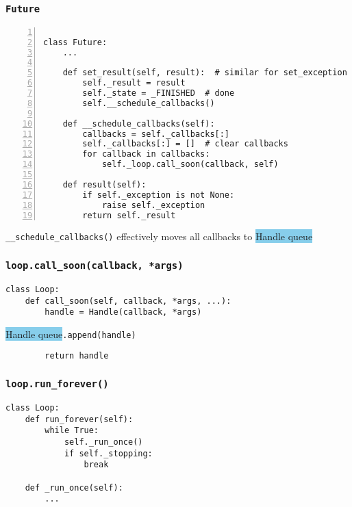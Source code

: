 \documentclass[compress,usenames,dvipsnames]{beamer}
\begin{document}
\begin{frame}
    \frametitle{\lstinline{Future}}
    \scriptsize
    \begin{lstlisting}[numbers=left]

class Future:
    ...

    def set_result(self, result):  # similar for set_exception
        self._result = result
        self._state = _FINISHED  # done
        self.__schedule_callbacks()

    def __schedule_callbacks(self):
        callbacks = self._callbacks[:]
        self._callbacks[:] = []  # clear callbacks
        for callback in callbacks:
            self._loop.call_soon(callback, self)

    def result(self):
        if self._exception is not None:
            raise self._exception
        return self._result
    \end{lstlisting}
\lstinline{__schedule_callbacks()} effectively moves all callbacks to \colorbox{SkyBlue}{Handle queue}
\end{frame}

\begin{frame}
    \frametitle{\lstinline{loop.call_soon(callback, *args)}}
    \begin{lstlisting}
class Loop:
    def call_soon(self, callback, *args, ...):
        handle = Handle(callback, *args)
    \end{lstlisting}
 \colorbox{SkyBlue}{Handle queue}\lstinline{.append(handle)}
    \begin{lstlisting}
        return handle
    \end{lstlisting}
\end{frame}

\begin{frame}
    \frametitle{\lstinline{loop.run_forever()}}
    \begin{lstlisting}
class Loop:
    def run_forever(self):
        while True:
            self._run_once()
            if self._stopping:
                break

    def _run_once(self):
        ...
    \end{lstlisting}
\end{frame}
\end{document}
